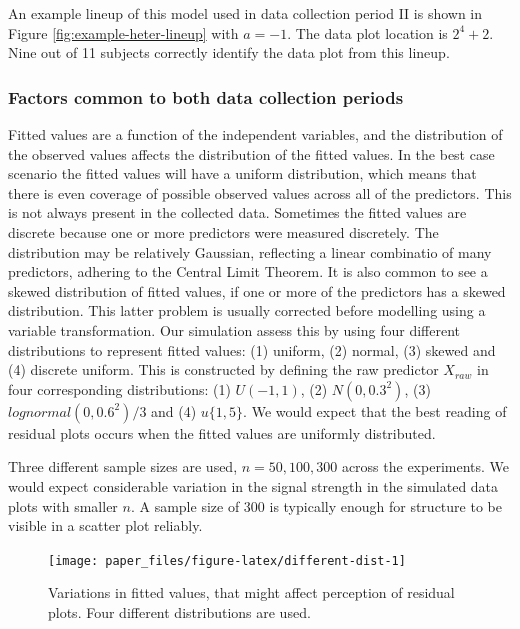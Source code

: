 \documentclass[]{interact}
\theoremstyle{plain}%
\theoremstyle{definition}
\theoremstyle{remark}
\begin{document}
An example lineup of this model used in data collection period II is
shown in Figure \ref{fig:example-heter-lineup} with \(a = -1\). The data
plot location is \(2^4 + 2\). Nine out of 11 subjects correctly identify
the data plot from this lineup.

\hypertarget{factors-common-to-both-data-collection-periods}{%
\subsubsection{Factors common to both data collection
periods}\label{factors-common-to-both-data-collection-periods}}

Fitted values are a function of the independent variables, and the
distribution of the observed values affects the distribution of the
fitted values. In the best case scenario the fitted values will have a
uniform distribution, which means that there is even coverage of
possible observed values across all of the predictors. This is not
always present in the collected data. Sometimes the fitted values are
discrete because one or more predictors were measured discretely. The
distribution may be relatively Gaussian, reflecting a linear combinatio
of many predictors, adhering to the Central Limit Theorem. It is also
common to see a skewed distribution of fitted values, if one or more of
the predictors has a skewed distribution. This latter problem is usually
corrected before modelling using a variable transformation. Our
simulation assess this by using four different distributions to
represent fitted values: (1) uniform, (2) normal, (3) skewed and (4)
discrete uniform. This is constructed by defining the raw predictor
\(X_{raw}\) in four corresponding distributions: (1) \(U(-1, 1)\), (2)
\(N(0, 0.3^2)\), (3) \(lognormal(0, 0.6^2)/3\) and (4) \(u\{1, 5\}\). We
would expect that the best reading of residual plots occurs when the
fitted values are uniformly distributed.

Three different sample sizes are used, \(n=50, 100, 300\) across the
experiments. We would expect considerable variation in the signal
strength in the simulated data plots with smaller \(n\). A sample size
of 300 is typically enough for structure to be visible in a scatter plot
reliably.

\begin{figure}

{\centering \texttt{[image: paper\_files/figure-latex/different-dist-1]} 

}

\caption{Variations in fitted values, that might affect perception of residual plots. Four different distributions are used.}\label{fig:different-dist}
\end{figure}
\end{document}
